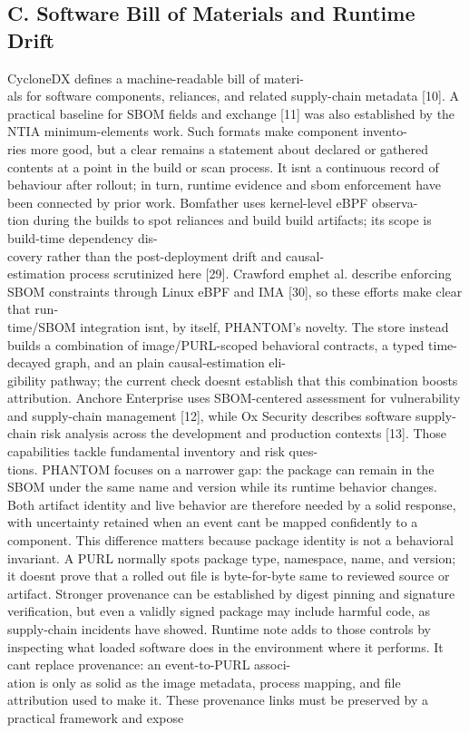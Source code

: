 \documentclass[conference]{IEEEtran}
\begin{document}
\subsection*{C. Software Bill of Materials and Runtime Drift}
CycloneDX defines a machine-readable bill of materi-\\als for software components, reliances, and related supply-chain metadata {[}10{]}. A practical baseline for SBOM fields and exchange {[}11{]} was also established by the NTIA minimum-elements work. Such formats make component invento-\\ries more good, but a clear remains a statement about declared or gathered contents at a point in the build or scan process. It isn\textquotesingle t a continuous record of behaviour after rollout; in turn, runtime evidence and sbom enforcement have been connected by prior work. Bomfather uses kernel-level eBPF observa-\\tion during the builds to spot reliances and build build artifacts; its scope is build-time dependency dis-\\covery rather than the post-deployment drift and causal-\\estimation process scrutinized here {[}29{]}. Crawford emphet al. describe enforcing SBOM constraints through Linux eBPF and IMA {[}30{]}, so these efforts make clear that run-\\time/SBOM integration isn\textquotesingle t, by itself, PHANTOM's novelty. The store instead builds a combination of image/PURL-scoped behavioral contracts, a typed time-decayed graph, and an plain causal-estimation eli-\\gibility pathway; the current check doesn\textquotesingle t establish that this combination boosts attribution. Anchore Enterprise uses SBOM-centered assessment for vulnerability and supply-chain management {[}12{]}, while Ox Security describes software supply-chain risk analysis across the development and production contexts {[}13{]}. Those capabilities tackle fundamental inventory and risk ques-\\tions. PHANTOM focuses on a narrower gap: the package can remain in the SBOM under the same name and version while its runtime behavior changes. Both artifact identity and live behavior are therefore needed by a solid response, with uncertainty retained when an event can\textquotesingle t be mapped confidently to a component. This difference matters because package identity is not a behavioral invariant. A PURL normally spots package type, namespace, name, and version; it doesn\textquotesingle t prove that a rolled out file is byte-for-byte same to reviewed source or artifact. Stronger provenance can be established by digest pinning and signature verification, but even a validly signed package may include harmful code, as supply-chain incidents have showed. Runtime note adds to those controls by inspecting what loaded software does in the environment where it performs. It can\textquotesingle t replace provenance: an event-to-PURL associ-\\ation is only as solid as the image metadata, process mapping, and file attribution used to make it. These provenance links must be preserved by a practical framework and expose 
\end{document}
